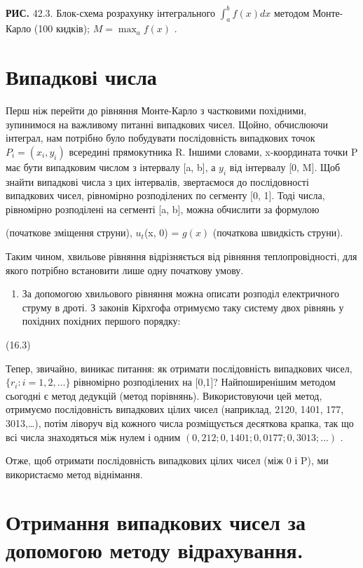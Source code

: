 \documentclass[
  ukrainian,
]{article}
\author{}
\date{}
\providecommand{\tightlist}{%
  \setlength{\itemsep}{0pt}\setlength{\parskip}{0pt}}
\begin{document}
\textbf{РИС.} 42.3. Блок-схема розрахунку інтегрального
\(\int_{a}^{b} f(x) dx\) методом Монте-Карло (100 кидків);
\(M = \max_{a} f(x)\) .

\section{Випадкові
числа}\label{ux432ux438ux43fux430ux434ux43aux43eux432ux456-ux447ux438ux441ux43bux430}

Перш ніж перейти до рівняння Монте-Карло з частковими похідними,
зупинимося на важливому питанні випадкових чисел. Щойно, обчислюючи
інтеграл, нам потрібно було побудувати послідовність випадкових точок
\(P_i = (x_i, y_i)\) всередині прямокутника R. Іншими словами,
x-координата точки P має бути випадковим числом з інтервалу {[}a, b{]},
а \(y_i\) від інтервалу {[}0, M{]}. Щоб знайти випадкові числа з цих
інтервалів, звертаємося до послідовності випадкових чисел, рівномірно
розподілених по сегменту {[}0, 1{]}. Тоді числа, рівномірно розподілені
на сегменті {[}a, b{]}, можна обчислити за формулою

(початкове зміщення струни), \(u_t\)(x, 0) = \(g(x)\) (початкова
швидкість струни).

Таким чином, хвильове рівняння відрізняється від рівняння
теплопровідності, для якого потрібно встановити лише одну початкову
умову.

\begin{enumerate}
\def\labelenumi{\arabic{enumi}.}
\setcounter{enumi}{3}
\tightlist
\item
  За допомогою хвильового рівняння можна описати розподіл електричного
  струму в дроті. З законів Кірхгофа отримуємо таку систему двох рівнянь
  у похідних похідних першого порядку:
\end{enumerate}

(16.3)

Тепер, звичайно, виникає питання: як отримати послідовність випадкових
чисел, \(\{r_i: i=1,2,\ldots\}\) рівномірно розподілених на {[}0,1{]}?
Найпоширенішим методом сьогодні є метод дедукцій (метод порівнянь).
Використовуючи цей метод, отримуємо послідовність випадкових цілих чисел
(наприклад, 2120, 1401, 177, 3013,\ldots), потім ліворуч від кожного
числа розміщується десяткова крапка, так що всі числа знаходяться між
нулем і одним \((0,212; 0,1401; 0,0177; 0,3013; \ldots)\) .

Отже, щоб отримати послідовність випадкових цілих чисел (між 0 і P), ми
використаємо метод віднімання.

\section{Отримання випадкових чисел за допомогою методу
відрахування.}\label{ux43eux442ux440ux438ux43cux430ux43dux43dux44f-ux432ux438ux43fux430ux434ux43aux43eux432ux438ux445-ux447ux438ux441ux435ux43b-ux437ux430-ux434ux43eux43fux43eux43cux43eux433ux43eux44e-ux43cux435ux442ux43eux434ux443-ux432ux456ux434ux440ux430ux445ux443ux432ux430ux43dux43dux44f.}
\end{document}
